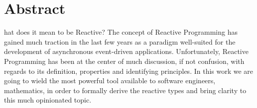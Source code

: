 %
%
%

\chapter*{Abstract}
hat does it mean to be Reactive? The concept of Reactive Programming has gained much traction in the last few years as a paradigm well-suited for the development of asynchronous  event-driven applications. Unfortunately, Reactive Programming has been at the center of much discussion, if not confusion, with regards to its definition, properties and identifying principles. In this work we are going to wield the most powerful tool available to software engineers, mathematics, in order to formally derive the reactive types and bring clarity to this much opinionated topic.
\clearpage